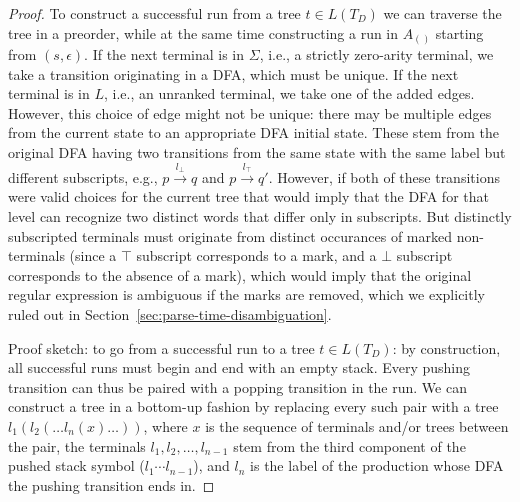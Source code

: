 \documentclass[acmsmall,review,anonymous]{acmart}\settopmatter{printfolios=true,printccs=false,printacmref=false}
\newcommand{\T}{\Sigma} %
\newcommand{\Labels}{L} %
\newcommand{\pospl}{(}
\newcommand{\pospr}{)}
\newcommand{\posp}[1]{\pospl#1\pospr}
\begin{document}
\begin{proof}
  To construct a successful run from a tree $t \in L(T_D)$ we can traverse the tree in a preorder, while at the same time constructing a run in $A_{\posp{}}$ starting from $(s, \epsilon)$. If the next terminal is in $\T$, i.e., a strictly zero-arity terminal, we take a transition originating in a DFA, which must be unique. If the next terminal is in $\Labels$, i.e., an unranked terminal, we take one of the added edges. However, this choice of edge might not be unique: there may be multiple edges from the current state to an appropriate DFA initial state. These stem from the original DFA having two transitions from the same state with the same label but different subscripts, e.g., $p \xrightarrow{l_\bot} q$ and $p \xrightarrow{l_\top} q'$. However, if both of these transitions were valid choices for the current tree that would imply that the DFA for that level can recognize two distinct words that differ only in subscripts. But distinctly subscripted terminals must originate from distinct occurances of marked non-terminals (since a $\top$ subscript corresponds to a mark, and a $\bot$ subscript corresponds to the absence of a mark), which would imply that the original regular expression is ambiguous if the marks are removed, which we explicitly ruled out in Section~\ref{sec:parse-time-disambiguation}.

  Proof sketch: to go from a successful run to a tree $t \in L(T_D)$: by construction, all successful runs must begin and end with an empty stack. Every pushing transition can thus be paired with a popping transition in the run. We can construct a tree in a bottom-up fashion by replacing every such pair with a tree $l_1(l_2(\ldots l_n(x)\ldots))$, where $x$ is the sequence of terminals and/or trees between the pair, the terminals $l_1, l_2, \ldots, l_{n-1}$ stem from the third component of the pushed stack symbol ($l_1 \cdots l_{n-1}$), and $l_n$ is the label of the production whose DFA the pushing transition ends in.


\end{proof}
\end{document}

